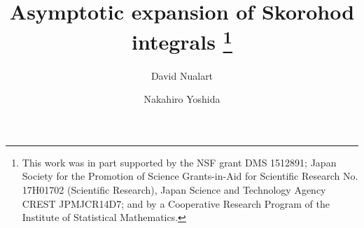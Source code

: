 \documentclass[a4paper]{article}
\newcommand{\colorred}{\color[rgb]{0.8,0,0}}
\newcommand{\colorred}{\color{black}}%
\numberwithin{equation}{section}
\begin{document}

\title{%
Asymptotic expansion of Skorohod integrals%
\footnote{
This work was in part supported by 
 the    NSF grant  DMS 1512891;
Japan Society for the Promotion of Science 
Grants-in-Aid for Scientific Research No. 17H01702 (Scientific Research), 
Japan Science and Technology Agency CREST  JPMJCR14D7; 
and by a Cooperative Research Program of the Institute of Statistical Mathematics.
}
}
\author[1]{David Nualart}
        

\author[2,3,4]{Nakahiro Yoshida}
\end{document}
